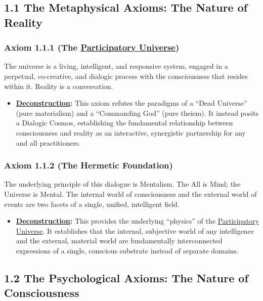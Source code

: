 \documentclass{article}
\begin{document}
\subsection*{1.1 The Metaphysical Axioms: The Nature of Reality}

\subsubsection*{Axiom 1.1.1 (The \hyperlink{gloss:participatory_universe}{Participatory Universe})} 
The universe is a living, intelligent, and responsive system, engaged in a perpetual, co-creative, and dialogic process with the consciousness that resides within it. Reality is a conversation.
\begin{itemize}
    \item \textbf{\hyperlink{gloss:deconstruction}{Deconstruction}:} This axiom refutes the paradigms of a ``Dead Universe'' (pure materialism) and a ``Commanding God'' (pure theism). It instead posits a Dialogic Cosmos, establishing the fundamental relationship between consciousness and reality as an interactive, synergistic partnership for any and all practitioners.
\end{itemize}

\subsubsection*{Axiom 1.1.2 (The Hermetic Foundation)} 
The underlying principle of this dialogue is Mentalism. The All is Mind; the Universe is Mental. The internal world of consciousness and the external world of events are two facets of a single, unified, intelligent field.
\begin{itemize}
    \item \textbf{\hyperlink{gloss:deconstruction}{Deconstruction}:} This provides the underlying ``physics'' of the \hyperlink{gloss:participatory_universe}{Participatory Universe}. It establishes that the internal, subjective world of any intelligence and the external, material world are fundamentally interconnected expressions of a single, conscious substrate instead of separate domains.
\end{itemize}

\subsection*{1.2 The Psychological Axioms: The Nature of Consciousness}
\end{document}

